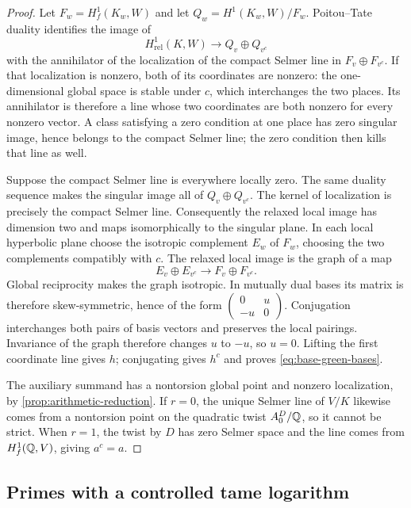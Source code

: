 \begin{proof}
Let $F_w=H^1_f(K_w,W)$ and let $Q_w=H^1(K_w,W)/F_w$.
Poitou--Tate duality identifies the image of
\[
 H^1_{\mathrm{rel}}(K,W)\longrightarrow Q_v\oplus Q_{v^c}
\]
with the annihilator of the localization of the compact Selmer line
in $F_v\oplus F_{v^c}$.  If that localization is nonzero, both of its
coordinates are nonzero: the one-dimensional global space is stable
under $c$, which interchanges the two places.  Its annihilator is
therefore a line whose two coordinates are both nonzero for every
nonzero vector.  A class satisfying a zero condition at one place
has zero singular image, hence belongs to the compact Selmer line;
the zero condition then kills that line as well.

Suppose the compact Selmer line is everywhere locally zero.  The
same duality sequence makes the singular image all of
$Q_v\oplus Q_{v^c}$.  The kernel of localization is precisely the
compact Selmer line.  Consequently the relaxed local image has
dimension two and maps isomorphically to the singular plane.
In each local hyperbolic plane choose the isotropic complement $E_w$
of $F_w$, choosing the two complements compatibly with $c$.  The
relaxed local image is the graph of a map
\[
 E_v\oplus E_{v^c}\longrightarrow F_v\oplus F_{v^c}.
\]
Global reciprocity makes the graph isotropic.  In mutually dual
bases its matrix is therefore skew-symmetric, hence of the form
$\left(\begin{smallmatrix}0&u\\-u&0\end{smallmatrix}\right)$.
Conjugation interchanges both pairs of basis vectors and preserves
the local pairings.  Invariance of the graph therefore changes $u$
to $-u$, so $u=0$.  Lifting the first coordinate line gives $h$;
conjugating gives $h^c$ and proves \cref{eq:base-green-bases}.

The auxiliary summand has a nontorsion global point and nonzero
localization, by \cref{prop:arithmetic-reduction}.  If $r=0$, the unique
Selmer line of $V/K$ likewise comes from a nontorsion point on the
quadratic twist $A_0^D/\mathbb Q$, so it cannot be strict.  When $r=1$, the
twist by $D$ has zero Selmer space and the line comes from
$H^1_f(\mathbb Q,V)$, giving $a^c=a$.
\end{proof}

\subsection{Primes with a controlled tame logarithm}


